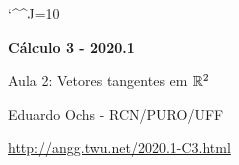 \documentclass[oneside,12pt]{article}
\begin{document}
\catcode`\^^J=10




\long{}
\long{}
\long{}
\long{}
\long{}
\long{}
\long{}
\long{}
\long{}
\long{}

\long{}
\long{}

\def\frown{\ensuremath{{=}{(}}}
\def\True {\mathbf{V}}
\def\False{\mathbf{F}}

\def\drafturl{http://angg.twu.net/LATEX/2020-1-C2.pdf}
\def\drafturl{http://angg.twu.net/2020.1-C2.html}
\def\draftfooter{\tiny \href{\drafturl}{\jobname{}} \ColorBrown{\shorttoday{} \hours}}


%

\thispagestyle{empty}

\begin{center}

\vspace*{1.2cm}

{\bf \Large Cálculo 3 - 2020.1}

\bsk

Aula 2: Vetores tangentes em $\mathbb{R}^2$

\bsk

Eduardo Ochs - RCN/PURO/UFF

\url{http://angg.twu.net/2020.1-C3.html}

\end{center}

\newpage
\end{document}
